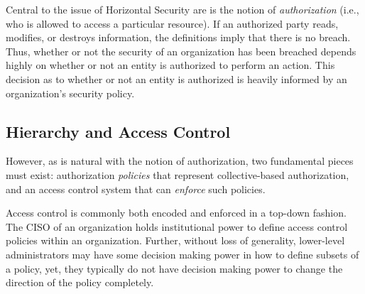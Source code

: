 
Central to the issue of Horizontal Security are is the notion of
\emph{authorization} (i.e., who is allowed to access a particular resource). If
an authorized party reads, modifies, or destroys information, the definitions
imply that there is no breach. Thus, whether or not the security of an
organization has been breached depends highly on whether or not an entity is
authorized to perform an action. This decision as to whether or not an entity is
authorized is heavily informed by an organization's security policy.



%
\subsection{Hierarchy and Access Control}
\label{sec:definition}

However, as is natural with the notion of authorization, two fundamental pieces
must exist: authorization \emph{policies} that represent collective-based
authorization, and an access control system that can \emph{enforce} such
policies.

Access control is commonly both encoded and enforced in a top-down fashion. The
CISO of an organization holds institutional power to define access control
policies within an organization. Further, without loss of generality,
lower-level administrators may have some decision making power in how to define
subsets of a policy, yet, they typically do not have decision making power to
change the direction of the policy completely. 


